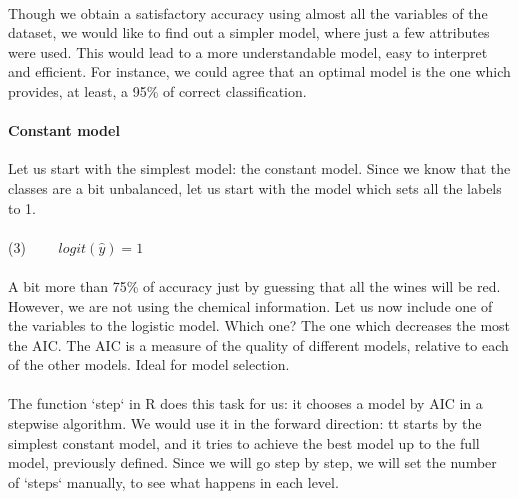 \documentclass[10pt]{article}
\begin{document}
\paragraph*{}
Though we obtain a satisfactory accuracy using almost all the variables of the dataset, we would like to find out a simpler model, where just a few attributes were used. This would lead to a more understandable model, easy to interpret and efficient. For instance, we could agree that an optimal model is the one which provides, at least, a 95\% of correct classification.


\paragraph{Constant model}	

Let us start with the simplest model: the constant model. Since we know that the classes are a bit unbalanced, let us start with the model which sets all the labels to 1.

\paragraph*{}
(3) \ \ \ \  $logit(\hat{y}) = 1$

\paragraph*{}
A bit more than 75\% of accuracy just by guessing that all the wines will be red. However, we are not using the chemical information. Let us now include one of the variables to the logistic model. Which one? The one which decreases the most the AIC. The AIC is a measure of the quality of different models, relative to each of the other models. Ideal for model selection.

\paragraph*{}
The function `step` in R does this task for us: it chooses a model by AIC in a stepwise algorithm. We would use it in the forward direction: tt starts by the simplest constant model, and it tries to achieve the best model up to the full model, previously defined. Since we will go step by step, we will set the number of `steps` manually, to see what happens in each level.
\end{document}
